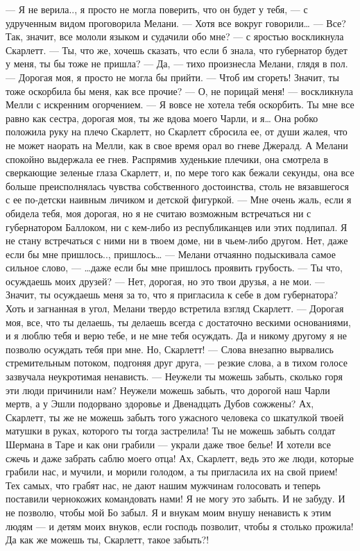 — Я не верила.., я просто не могла поверить, что он будет у тебя, — с удрученным видом проговорила Мелани. — Хотя все вокруг говорили…
— Все? Так, значит, все мололи языком и судачили обо мне? — с яростью воскликнула Скарлетт. — Ты, что же, хочешь сказать, что если б знала, что губернатор будет у меня, ты бы тоже не пришла?
— Да, — тихо произнесла Мелани, глядя в пол. — Дорогая моя, я просто не могла бы прийти.
— Чтоб им сгореть! Значит, ты тоже оскорбила бы меня, как все прочие?
— О, не порицай меня! — воскликнула Мелли с искренним огорчением. — Я вовсе не хотела тебя оскорбить. Ты мне все равно как сестра, дорогая моя, ты же вдова моего Чарли, и я…
Она робко положила руку на плечо Скарлетт, но Скарлетт сбросила ее, от души жалея, что не может наорать на Мелли, как в свое время орал во гневе Джералд. А Мелани спокойно выдержала ее гнев. Распрямив худенькие плечики, она смотрела в сверкающие зеленые глаза Скарлетт, и, по мере того как бежали секунды, она все больше преисполнялась чувства собственного достоинства, столь не вязавшегося с ее по-детски наивным личиком и детской фигуркой.
— Мне очень жаль, если я обидела тебя, моя дорогая, но я не считаю возможным встречаться ни с губернатором Баллоком, ни с кем-либо из республиканцев или этих подлипал. Я не стану встречаться с ними ни в твоем доме, ни в чьем-либо другом. Нет, даже если бы мне пришлось.., пришлось… — Мелани отчаянно подыскивала самое сильное слово, — …даже если бы мне пришлось проявить грубость.
— Ты что, осуждаешь моих друзей?
— Нет, дорогая, но это твои друзья, а не мои.
— Значит, ты осуждаешь меня за то, что я пригласила к себе в дом губернатора?
Хоть и загнанная в угол, Мелани твердо встретила взгляд Скарлетт.
— Дорогая моя, все, что ты делаешь, ты делаешь всегда с достаточно вескими основаниями, и я люблю тебя и верю тебе, и не мне тебя осуждать. Да и никому другому я не позволю осуждать тебя при мне. Но, Скарлетт! — Слова внезапно вырвались стремительным потоком, подгоняя друг друга, — резкие слова, а в тихом голосе зазвучала неукротимая ненависть. — Неужели ты можешь забыть, сколько горя эти люди причинили нам? Неужели можешь забыть, что дорогой наш Чарли мертв, а у Эшли подорвано здоровье и Двенадцать Дубов сожжены? Ах, Скарлетт, ты же не можешь забыть того ужасного человека со шкатулкой твоей матушки в руках, которого ты тогда застрелила! Ты не можешь забыть солдат Шермана в Таре и как они грабили — украли даже твое белье! И хотели все сжечь и даже забрать саблю моего отца! Ах, Скарлетт, ведь это же люди, которые грабили нас, и мучили, и морили голодом, а ты пригласила их на свой прием! Тех самых, что грабят нас, не дают нашим мужчинам голосовать и теперь поставили чернокожих командовать нами! Я не могу это забыть. И не забуду. И не позволю, чтобы мой Бо забыл. Я и внукам моим внушу ненависть к этим людям — и детям моих внуков, если господь позволит, чтобы я столько прожила! Да как же можешь ты, Скарлетт, такое забыть?!
